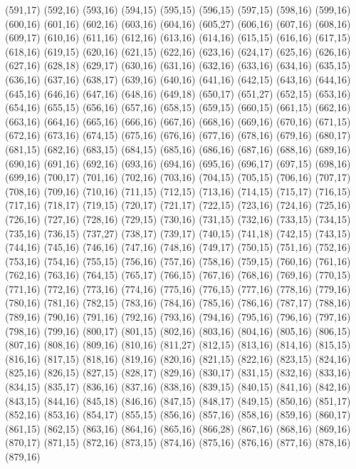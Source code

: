 (591,17)
(592,16)
(593,16)
(594,15)
(595,15)
(596,15)
(597,15)
(598,16)
(599,16)
(600,16)
(601,16)
(602,16)
(603,16)
(604,16)
(605,27)
(606,16)
(607,16)
(608,16)
(609,17)
(610,16)
(611,16)
(612,16)
(613,16)
(614,16)
(615,15)
(616,16)
(617,15)
(618,16)
(619,15)
(620,16)
(621,15)
(622,16)
(623,16)
(624,17)
(625,16)
(626,16)
(627,16)
(628,18)
(629,17)
(630,16)
(631,16)
(632,16)
(633,16)
(634,16)
(635,15)
(636,16)
(637,16)
(638,17)
(639,16)
(640,16)
(641,16)
(642,15)
(643,16)
(644,16)
(645,16)
(646,16)
(647,16)
(648,16)
(649,18)
(650,17)
(651,27)
(652,15)
(653,16)
(654,16)
(655,15)
(656,16)
(657,16)
(658,15)
(659,15)
(660,15)
(661,15)
(662,16)
(663,16)
(664,16)
(665,16)
(666,16)
(667,16)
(668,16)
(669,16)
(670,16)
(671,15)
(672,16)
(673,16)
(674,15)
(675,16)
(676,16)
(677,16)
(678,16)
(679,16)
(680,17)
(681,15)
(682,16)
(683,15)
(684,15)
(685,16)
(686,16)
(687,16)
(688,16)
(689,16)
(690,16)
(691,16)
(692,16)
(693,16)
(694,16)
(695,16)
(696,17)
(697,15)
(698,16)
(699,16)
(700,17)
(701,16)
(702,16)
(703,16)
(704,15)
(705,15)
(706,16)
(707,17)
(708,16)
(709,16)
(710,16)
(711,15)
(712,15)
(713,16)
(714,15)
(715,17)
(716,15)
(717,16)
(718,17)
(719,15)
(720,17)
(721,17)
(722,15)
(723,16)
(724,16)
(725,16)
(726,16)
(727,16)
(728,16)
(729,15)
(730,16)
(731,15)
(732,16)
(733,15)
(734,15)
(735,16)
(736,15)
(737,27)
(738,17)
(739,17)
(740,15)
(741,18)
(742,15)
(743,15)
(744,16)
(745,16)
(746,16)
(747,16)
(748,16)
(749,17)
(750,15)
(751,16)
(752,16)
(753,16)
(754,16)
(755,15)
(756,16)
(757,16)
(758,16)
(759,15)
(760,16)
(761,16)
(762,16)
(763,16)
(764,15)
(765,17)
(766,15)
(767,16)
(768,16)
(769,16)
(770,15)
(771,16)
(772,16)
(773,16)
(774,16)
(775,16)
(776,15)
(777,16)
(778,16)
(779,16)
(780,16)
(781,16)
(782,15)
(783,16)
(784,16)
(785,16)
(786,16)
(787,17)
(788,16)
(789,16)
(790,16)
(791,16)
(792,16)
(793,16)
(794,16)
(795,16)
(796,16)
(797,16)
(798,16)
(799,16)
(800,17)
(801,15)
(802,16)
(803,16)
(804,16)
(805,16)
(806,15)
(807,16)
(808,16)
(809,16)
(810,16)
(811,27)
(812,15)
(813,16)
(814,16)
(815,15)
(816,16)
(817,15)
(818,16)
(819,16)
(820,16)
(821,15)
(822,16)
(823,15)
(824,16)
(825,16)
(826,15)
(827,15)
(828,17)
(829,16)
(830,17)
(831,15)
(832,16)
(833,16)
(834,15)
(835,17)
(836,16)
(837,16)
(838,16)
(839,15)
(840,15)
(841,16)
(842,16)
(843,15)
(844,16)
(845,18)
(846,16)
(847,15)
(848,17)
(849,15)
(850,16)
(851,17)
(852,16)
(853,16)
(854,17)
(855,15)
(856,16)
(857,16)
(858,16)
(859,16)
(860,17)
(861,15)
(862,15)
(863,16)
(864,16)
(865,16)
(866,28)
(867,16)
(868,16)
(869,16)
(870,17)
(871,15)
(872,16)
(873,15)
(874,16)
(875,16)
(876,16)
(877,16)
(878,16)
(879,16)
